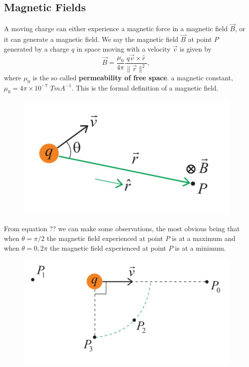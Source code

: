 \subsection{Magnetic Fields}

A moving charge can either experience a magnetic force in a magnetic field $\vec{B}$, or it can generate a magnetic field. We say the magnetic field $\vec{B}$ at point $P$ generated by a charge $q$ in space moving with a velocity $\vec{v}$ is given by
\begin{equation}
    \vec{B} = \frac{\mu_0}{4\pi} \frac{q \vec{v} \times \hat{r}}{\| \vec{r} \|^2},
\end{equation}
where $\mu_0$ is the so called \textbf{permeability of free space}. a magnetic constant, $\mu_0 = 4\pi \times 10^{-7}$ $TmA^{-1}$. This is the formal definition of a magnetic field. 

\begin{figure}[h!]
    \centering
    \includegraphics[scale=0.8]{notes/images/Magnetic-Field-Definition-1.JPG}
\end{figure}
\FloatBarrier

From equation ?? we can make some observations, the most obvious being that when $\theta = \pi/2$ the magnetic field experienced at point $P$ is at a maximum and when $\theta = 0, 2\pi$ the magnetic field experienced at point $P$ is at a minimum. 

\begin{figure}[h!]
    \centering
    \includegraphics[scale=0.8]{notes/images/Magnetic-Field-Definition-2.JPG}
\end{figure}
\FloatBarrier

